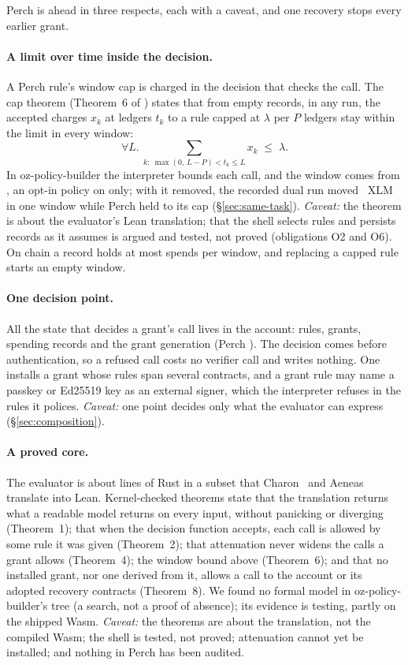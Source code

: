 Perch is ahead in three respects, each with a caveat, and one recovery stops
every earlier grant.

\paragraph{A limit over time inside the decision.} A Perch rule's window cap is
charged in the decision that checks the call. The cap theorem (Theorem~6 of
) states that from empty records, in any run, the accepted
charges $x_k$ at ledgers $t_k$ to a rule capped at $\lambda$ per $P$ ledgers stay
within the limit in every window:
\[
  \forall L.\ \sum_{k:\ \max(0,\,L-P) < t_k \le L} x_k \;\le\; \lambda .
\]
In oz-policy-builder the interpreter bounds each call, and the window comes from
, an opt-in policy on  only; with it removed,
the recorded dual run moved ~XLM in one window
while Perch held to its cap (\S\ref{sec:same-task}). \emph{Caveat:} the theorem
is about the evaluator's Lean translation; that the shell selects rules and
persists records as it assumes is argued and tested, not proved (obligations O2
and O6). On chain a record holds at most  spends per
window, and replacing a capped rule starts an empty window.

\paragraph{One decision point.} All the state that decides a grant's call lives
in the account: rules, grants, spending records and the grant generation
(Perch ). The decision comes before authentication, so a refused
call costs no verifier call and writes nothing. One  installs a
grant whose rules span several contracts, and a grant rule may name a passkey or
Ed25519 key as an external signer, which the interpreter refuses in the rules it
polices. \emph{Caveat:} one point decides only what the evaluator can express
(\S\ref{sec:composition}).

\paragraph{A proved core.} The evaluator is about  lines of
 Rust in a subset that Charon~\cite{charon} and Aeneas~\cite{aeneas} translate
into Lean. Kernel-checked theorems state that the translation returns what a
readable model returns on every input, without panicking or diverging
(Theorem~1); that when the decision function accepts,
each call is allowed by some rule it was given (Theorem~2); that attenuation never widens the calls a grant allows (Theorem~4); the window bound
above (Theorem~6); and that no installed grant, nor one derived from it, allows a
call to the account or its adopted recovery contracts (Theorem~8). We
found no formal model in oz-policy-builder's tree (a search, not a proof of
absence); its evidence is testing, partly on the shipped Wasm.
\emph{Caveat:} the theorems are about the translation, not the compiled Wasm; the
shell is tested, not proved; attenuation cannot yet be installed; and nothing in
Perch has been audited.

